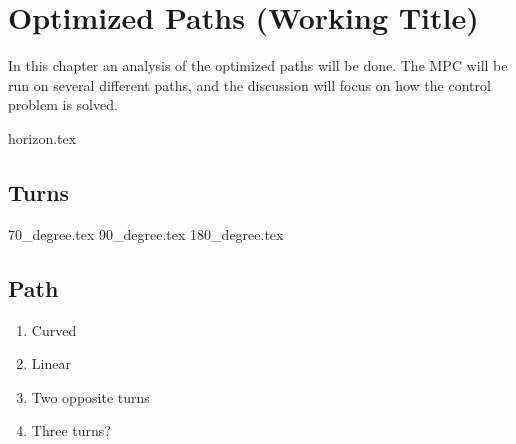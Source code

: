 \chapter{Optimized Paths (Working Title)}


In this chapter an analysis of the optimized paths will be done. The MPC will be run on several different paths, and the discussion will focus on how the control problem is solved.

{horizon.tex}

\section{Turns}
{70_degree.tex}
{90_degree.tex}
{180_degree.tex}	


\section{Path}

\begin{enumerate}
	\item Curved
	\item Linear
	\item Two opposite turns
	\item Three turns?
\end{enumerate}


